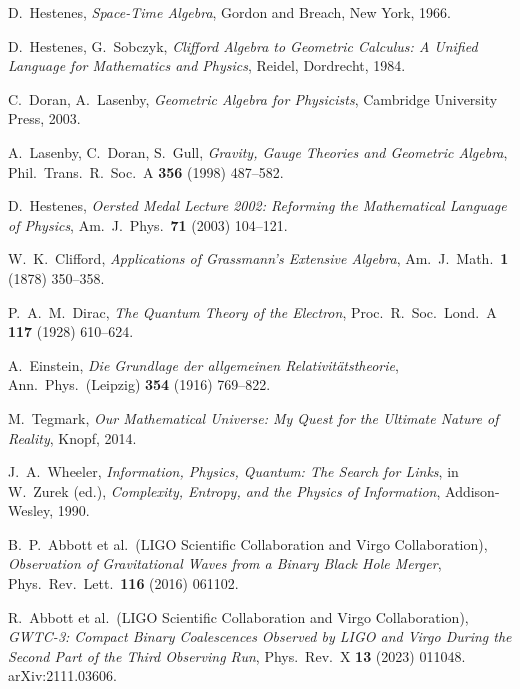 \documentclass[11pt,a4paper]{article}
\theoremstyle{definition}
\theoremstyle{plain}
\theoremstyle{remark}
\begin{document}
\begin{thebibliography}{99}\setlength{\itemsep}{3pt}

D.~Hestenes, \emph{Space-Time Algebra}, Gordon and Breach, New York, 1966.

D.~Hestenes, G.~Sobczyk, \emph{Clifford Algebra to Geometric Calculus: A Unified Language for Mathematics and Physics}, Reidel, Dordrecht, 1984.

C.~Doran, A.~Lasenby, \emph{Geometric Algebra for Physicists}, Cambridge University Press, 2003.

A.~Lasenby, C.~Doran, S.~Gull, \emph{Gravity, Gauge Theories and Geometric Algebra}, Phil.\ Trans.\ R.\ Soc.\ A \textbf{356} (1998) 487--582.

D.~Hestenes, \emph{Oersted Medal Lecture 2002: Reforming the Mathematical Language of Physics}, Am.\ J.\ Phys.\ \textbf{71} (2003) 104--121.

W.~K.~Clifford, \emph{Applications of Grassmann's Extensive Algebra}, Am.\ J.\ Math.\ \textbf{1} (1878) 350--358.

P.~A.~M.~Dirac, \emph{The Quantum Theory of the Electron}, Proc.\ R.\ Soc.\ Lond.\ A \textbf{117} (1928) 610--624.

A.~Einstein, \emph{Die Grundlage der allgemeinen Relativitätstheorie}, Ann.\ Phys.\ (Leipzig) \textbf{354} (1916) 769--822.

M.~Tegmark, \emph{Our Mathematical Universe: My Quest for the Ultimate Nature of Reality}, Knopf, 2014.

J.~A.~Wheeler, \emph{Information, Physics, Quantum: The Search for Links}, in W.~Zurek (ed.), \textit{Complexity, Entropy, and the Physics of Information}, Addison-Wesley, 1990.

B.~P.~Abbott et al.\ (LIGO Scientific Collaboration and Virgo Collaboration), \emph{Observation of Gravitational Waves from a Binary Black Hole Merger}, Phys.\ Rev.\ Lett.\ \textbf{116} (2016) 061102.

R.~Abbott et al.\ (LIGO Scientific Collaboration and Virgo Collaboration), \emph{GWTC-3: Compact Binary Coalescences Observed by LIGO and Virgo During the Second Part of the Third Observing Run}, Phys.\ Rev.\ X \textbf{13} (2023) 011048. arXiv:2111.03606.


\end{thebibliography}
\end{document}
